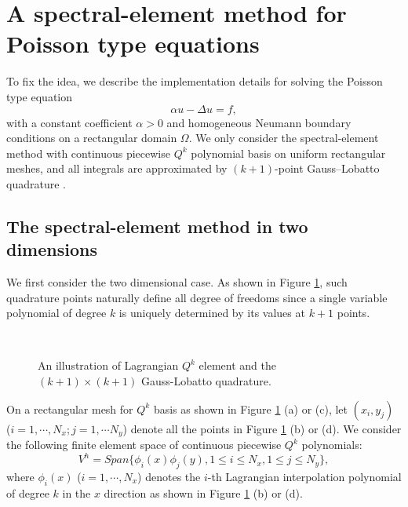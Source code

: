 \documentclass{article}
\begin{document}
 





\section{A spectral-element method for Poisson type equations}
\label{sec:tensor}
To fix the idea, we describe the implementation details for solving the Poisson type equation
\begin{equation}\label{pde}
    \alpha u - \Delta u = f,
\end{equation}
with a constant coefficient $\alpha>0$ and homogeneous Neumann boundary conditions on a  rectangular domain $\Omega$. 
We only consider  the spectral-element method with continuous piecewise $Q^k$ polynomial basis on uniform rectangular meshes, and all integrals are approximated by $(k+1)$-point Gauss--Lobatto quadrature \cite{li2020superconvergence}.


\subsection{The spectral-element method in two dimensions}
We first consider the two dimensional case. 
As shown in Figure \ref{mesh-Q2}, 
such quadrature points naturally define all degree of freedoms since a single variable polynomial of degree $k$ is uniquely determined by its values at $k+1$ points.


 
\begin{figure}[!ht]
 \hspace{.6in}
 \\
 \hspace{.6in}
\caption{An illustration of Lagrangian $Q^k$ element and the $(k+1)\times(k+1)$ Gauss-Lobatto quadrature. }
\label{mesh-Q2}
 \end{figure}

 

On a rectangular mesh for $Q^k$ basis as shown in  Figure \ref{mesh-Q2} (a) or (c), let $(x_i, y_j)$ ($i=1,\cdots, N_x; j=1,\cdots N_y$) denote all the points in Figure \ref{mesh-Q2} (b) or (d). We consider the following  finite element space of continuous piecewise $Q^k$ polynomials:
\begin{equation*}
    V^{h} = Span\{\phi_{i}(x)\phi_{j}(y), 1\leq i\leq N_x, 1\leq j\leq N_y\},
\end{equation*}
where $\phi_i(x)$ ($i=1,\cdots, N_x$) denotes the $i$-th Lagrangian interpolation polynomial of degree $k$ in the $x$ direction as shown in  Figure \ref{mesh-Q2} (b) or (d). 
\end{document}

